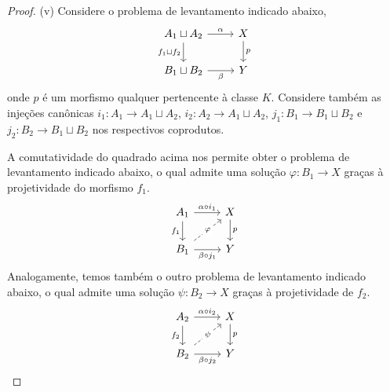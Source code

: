 \begin{proof}
  \smallskip
  (v) Considere o problema de levantamento indicado abaixo,
  \begin{equation}\label{eq:coproduto_proj_diag_1}
    \begin{tikzcd}
      A_1 \sqcup A_2
      \arrow[r, "\alpha"]
      \arrow[d, "f_1 \sqcup f_2" swap]
      & X
      \arrow[d, "p"]
      \\ B_1 \sqcup B_2
      \arrow[r, "\beta" swap]
      & Y
    \end{tikzcd}
  \end{equation}
  onde $p$ é um morfismo qualquer pertencente à classe $K$.
  Considere também as injeções canônicas $i_1: A_1 \to A_1 \sqcup A_2$, $i_2: A_2 \to A_1 \sqcup A_2$, $j_1: B_1 \to B_1 \sqcup B_2$ e $j_2: B_2 \to B_1 \sqcup B_2$ nos respectivos coprodutos.

  A comutatividade do quadrado acima nos permite obter o problema de levantamento indicado abaixo, o qual admite uma solução $\varphi: B_1 \to X$ graças à projetividade do morfismo $f_1$.
  \begin{equation}\label{eq:coproduto_proj_diag_2}
    \begin{tikzcd}
      A_1
      \arrow[r, "\alpha \circ i_1"]
      \arrow[d, "f_1" swap]
      & X
      \arrow[d, "p"]
      \\ B_1
      \arrow[r, "\beta \circ j_1" swap]
      \arrow[ru, dashed, "\varphi" description]
      & Y
    \end{tikzcd}
  \end{equation}
  Analogamente, temos também o outro problema de levantamento indicado abaixo, o qual admite uma solução $\psi: B_2 \to X$ graças à projetividade de $f_2$.
  \begin{equation}\label{eq:coproduto_proj_diag_3}
    \begin{tikzcd}
      A_2
      \arrow[r, "\alpha \circ i_2"]
      \arrow[d, "f_2" swap]
      & X
      \arrow[d, "p"]
      \\ B_2
      \arrow[r, "\beta \circ j_2" swap]
      \arrow[ru, dashed, "\psi" description]
      & Y
    \end{tikzcd}
  \end{equation}


\end{proof}
